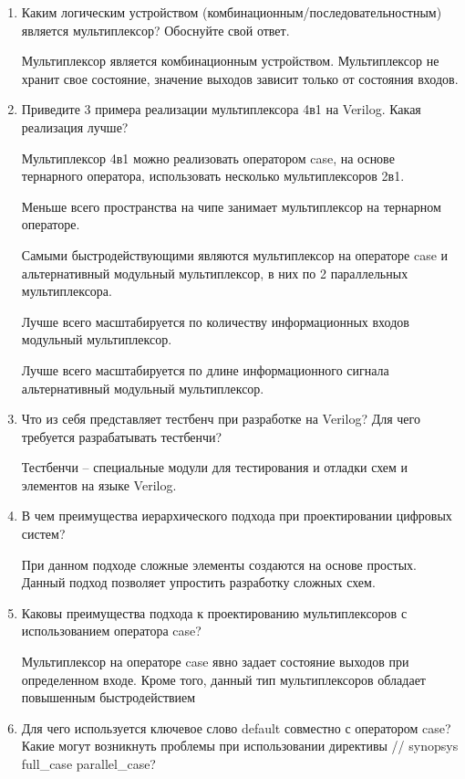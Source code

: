 \documentclass[a4paper,14pt]{article}
\begin{document}
\begin{enumerate}
	\item Каким логическим устройством (комбинационным/последовательностным) является	мультиплексор? Обоснуйте свой ответ.
	
	Мультиплексор является комбинационным устройством.
	Мультиплексор не хранит свое состояние, значение выходов зависит только от состояния входов.
	
	\item Приведите 3 примера реализации мультиплексора 4в1 на Verilog. Какая реализация лучше?

	Мультиплексор 4в1 можно реализовать оператором case, на основе тернарного оператора, использовать несколько мультиплексоров 2в1.
	
	Меньше всего пространства на чипе занимает мультиплексор на тернарном операторе.
	
	Самыми быстродействующими являются мультиплексор на операторе case и альтернативный модульный мультиплексор, в них по 2 параллельных мультиплексора.
	
	Лучше всего масштабируется по количеству информационных входов модульный мультиплексор.
	
	Лучше всего масштабируется по длине информационного сигнала альтернативный модульный мультиплексор.
	
	\item Что из себя представляет тестбенч при разработке на Verilog? Для чего требуется	разрабатывать тестбенчи?
	
	Тестбенчи -- специальные модули для тестирования и отладки схем и элементов на языке Verilog.
	
	\item В чем преимущества иерархического подхода при проектировании цифровых систем?
	
	При данном подходе сложные элементы создаются на основе простых.
	Данный подход позволяет упростить разработку сложных схем.
	
	\item Каковы преимущества подхода к проектированию мультиплексоров с использованием оператора case?
	
	Мультиплексор на операторе case явно задает состояние выходов при определенном входе.
	Кроме того, данный тип мультиплексоров обладает повышенным быстродействием
	
	\item Для чего используется ключевое слово default совместно с оператором case? Какие могут возникнуть проблемы при использовании директивы // synopsys full\_case parallel\_case?
	

\end{enumerate}
\end{document}
